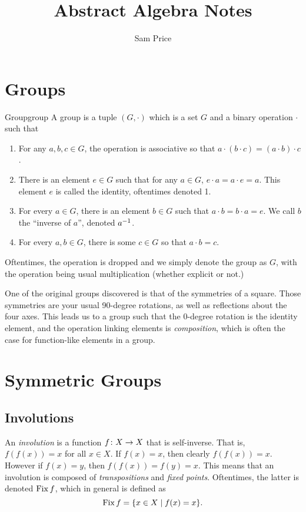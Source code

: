 \documentclass{article}
\author{Sam Price}
\title{Abstract Algebra Notes}
\begin{document}
\maketitle

\section{Groups}

\begin{definition}{Group}{group}
  A group is a tuple $(G, \cdot)$ which is a set $G$ and a binary operation $\cdot$ such that
  \begin{enumerate}[start=1,label={\arabic*\rparen}]
    \item For any $a, b, c \in G$, the operation is associative so that $a \cdot (b \cdot c) = (a \cdot b) \cdot c$.
    \item There is an element $e \in G$ such that for any $a \in G$, $e \cdot a = a \cdot e = a$.
          This element $e$ is called the identity, oftentimes denoted 1.
    \item For every $a \in G$, there is an element $b \in G$ such that $a \cdot b = b \cdot a = e$. We call $b$ the ``inverse of $a$'', denoted $a^{-1}$.
    \item For every $a, b \in G$, there is some $c \in G$ so that $a \cdot b = c$.
  \end{enumerate}

  Oftentimes, the operation is dropped and we simply denote the group as $G$,
  with the operation being usual multiplication (whether explicit or not.)
\end{definition}

One of the original groups discovered is that of the symmetries of a square.
Those symmetries are your usual 90-degree rotations, as well as reflections about the four axes.
This leads us to a group such that the 0-degree rotation is the identity element,
and the operation linking elements is \emph{composition}, which is often the case for
function-like elements in a group.

\section{Symmetric Groups}

\subsection{Involutions}

An \emph{involution} is a function $f \colon X \to X$ that is self-inverse.
That is, $f(f(x)) = x$ for all $x \in X$.
If $f(x) = x$, then clearly $f(f(x)) = x$.
However if $f(x) = y$, then $f(f(x)) = f(y) = x$.
This means that an involution is composed of \emph{transpositions} and \emph{fixed points}.
Oftentimes, the latter is denoted $\operatorname{Fix} f$, which in general is defined as
\[ \operatorname{Fix} f = \lbrace x \in X \mid f(x) = x \rbrace. \]
\end{document}
